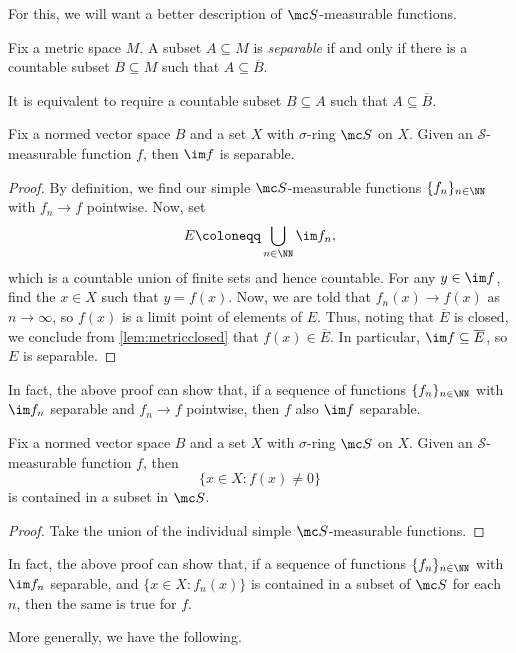 \documentclass[../notes.tex]{subfiles}
\begin{document}
For this, we will want a better description of $\mc S$-measurable functions.
\begin{definition}
	Fix a metric space $M$. A subset $A\subseteq M$ is \textit{separable} if and only if there is a countable subset $B\subseteq M$ such that $A\subseteq\overline B$.
\end{definition}
\begin{remark}
	It is equivalent to require a countable subset $B\subseteq A$ such that $A\subseteq\overline B$.
\end{remark}
\begin{lemma}
	Fix a normed vector space $B$ and a set $X$ with $\sigma$-ring $\mc S$ on $X$. Given an $\mathcal S$-measurable function $f$, then $\im f$ is separable.
\end{lemma}
\begin{proof}
	By definition, we find our simple $\mc S$-measurable functions $\{f_n\}_{n\in\NN}$ with $f_n\to f$ pointwise. Now, set
	\[E\coloneqq\bigcup_{n\in\NN}\im f_n,\]
	which is a countable union of finite sets and hence countable. For any $y\in\im f$, find the $x\in X$ such that $y=f(x)$. Now, we are told that $f_n(x)\to f(x)$ as $n\to\infty$, so $f(x)$ is a limit point of elements of $E$. Thus, noting that $\overline E$ is closed, we conclude from \autoref{lem:metricclosed} that $f(x)\in\overline E$. In particular, $\im f\subseteq\overline E$, so $E$ is separable.
\end{proof}
\begin{remark}
	In fact, the above proof can show that, if a sequence of functions $\{f_n\}_{n\in\NN}$ with $\im f_n$ separable and $f_n\to f$ pointwise, then $f$ also $\im f$ separable.
\end{remark}
\begin{lemma}
	Fix a normed vector space $B$ and a set $X$ with $\sigma$-ring $\mc S$ on $X$. Given an $\mathcal S$-measurable function $f$, then
	\[\{x\in X:f(x)\ne0\}\]
	is contained in a subset in $\mc S$.
\end{lemma}
\begin{proof}
	Take the union of the individual simple $\mc S$-measurable functions.
\end{proof}
\begin{remark}
	In fact, the above proof can show that, if a sequence of functions $\{f_n\}_{n\in\NN}$ with $\im f_n$ separable, and $\{x\in X:f_n(x)\}$ is contained in a subset of $\mc S$ for each $n$, then the same is true for $f$.
\end{remark}
More generally, we have the following.
\end{document}
